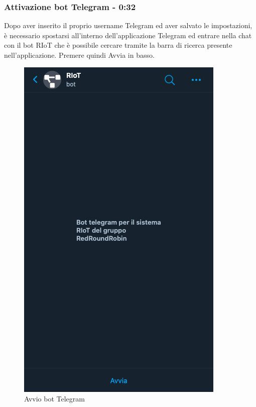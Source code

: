 	\subsubsection{Attivazione bot Telegram - 0:32}
		Dopo aver inserito il proprio username Telegram ed aver salvato le impostazioni, è necessario spostarsi all'interno dell'applicazione Telegram ed entrare nella chat con il bot RIoT che è possibile cercare tramite la barra di ricerca presente nell'applicazione.
		Premere quindi Avvia in basso.

		\begin{figure}[H]
		\centering
		\includegraphics[scale=0.600]{res/images/membro/avvioBot.png}
		\caption{Avvio bot Telegram}
	\end{figure}
